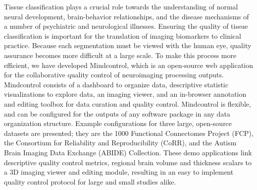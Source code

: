 Tissue classification plays a crucial role towards the understanding of normal neural development, brain-behavior relationships, and the disease mechanisms of a number of psychiatric and neurological illnesses. Ensuring the quality of tissue classification is important for the translation of imaging biomarkers to clinical practice. Because each segmentation must be viewed with the human eye, quality assurance becomes more difficult at a large scale. To make this process more efficient, we have developed Mindcontrol, which is an open-source web application for the collaborative quality control of neuroimaging processing outputs. Mindcontrol consists of a dashboard to organize data, descriptive statistic visualizations to explore data, an imaging viewer, and an in-browser annotation and editing toolbox for data curation and quality control. Mindcontrol is flexible, and can be configured for the outputs of any software package in any data organization structure. Example configurations for three large, open-source datasets are presented; they are the 1000 Functional Connectomes Project (FCP), the Consortium for Reliability and Reproducibility (CoRR), and the Autism Brain Imaging Data Exchange (ABIDE) Collection. These demo applications link descriptive quality control metrics, regional brain volume and thickness scalars to a 3D imaging viewer and editing module, resulting in an easy to implement quality control protocol for large and small studies alike.